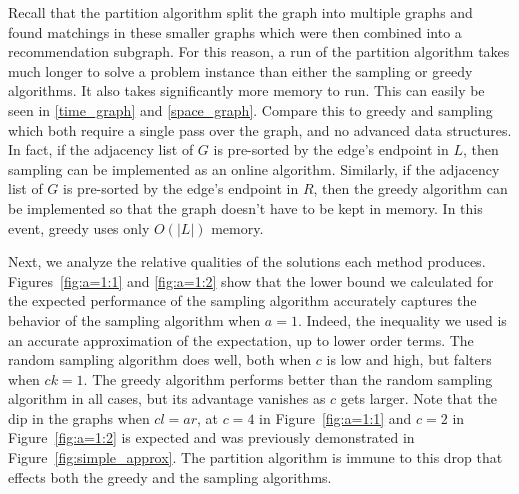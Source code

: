 Recall that the partition algorithm split the graph into multiple graphs
and found matchings in these smaller graphs which were then combined into
a recommendation subgraph. For this reason, a run of the partition
algorithm takes much longer to solve a problem instance than either the
sampling or greedy algorithms. It also takes significantly more memory to
run. This can easily be seen in \ref{time_graph} and \ref{space_graph}.
Compare this to greedy and sampling which both require a single pass over
the graph, and no advanced data structures. In fact, if the adjacency list
of $G$ is pre-sorted by the edge's endpoint in $L$, then sampling can be
implemented as an online algorithm. Similarly, if the adjacency list of $G$
is pre-sorted by the edge's endpoint in $R$, then the greedy algorithm can
be implemented so that the graph doesn't have to be kept in memory. In this
event, greedy uses only $O(|L|)$ memory.\vs

Next, we analyze the relative qualities of the solutions each method produces.
Figures~\ref{fig:a=1:1} and \ref{fig:a=1:2} show that the
lower bound we calculated for the expected performance of the sampling
algorithm accurately captures the behavior of the sampling algorithm
when $a=1$. Indeed, the inequality we used is an accurate
approximation of the expectation, up to lower order terms. The random
sampling algorithm does well, both when $c$ is low and high, but
falters when $ck=1$. The greedy algorithm performs better than the
random sampling algorithm in all cases, but its advantage vanishes as
$c$ gets larger. Note that the dip in the graphs when $cl=ar$, at
$c=4$ in Figure~\ref{fig:a=1:1} and $c=2$ in Figure~\ref{fig:a=1:2} is
expected and was previously demonstrated in Figure~\ref{fig:simple_approx}.
The partition algorithm is immune to this drop that effects both the greedy
and the sampling algorithms. 

